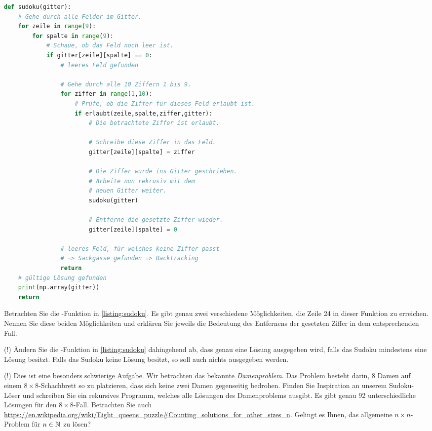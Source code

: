 \lstset{style=BaselineStyle}
\begin{lstlisting}[language=Python,caption=Implementation der Funktion \pythoninline{sudoku},label=listing:sudoku]
def sudoku(gitter):
	# Gehe durch alle Felder im Gitter.
	for zeile in range(9):
		for spalte in range(9):
			# Schaue, ob das Feld noch leer ist.
			if gitter[zeile][spalte] == 0:
				# leeres Feld gefunden

				# Gehe durch alle 10 Ziffern 1 bis 9.
				for ziffer in range(1,10):
					# Prüfe, ob die Ziffer für dieses Feld erlaubt ist.
					if erlaubt(zeile,spalte,ziffer,gitter):
						# Die betrachtete Ziffer ist erlaubt.

						# Schreibe diese Ziffer in das Feld.
						gitter[zeile][spalte] = ziffer

						# Die Ziffer wurde ins Gitter geschrieben.
						# Arbeite nun rekrusiv mit dem
						# neuen Gitter weiter.
						sudoku(gitter)

						# Entferne die gesetzte Ziffer wieder.
						gitter[zeile][spalte] = 0

				# leeres Feld, für welches keine Ziffer passt
				# => Sackgasse gefunden => Backtracking
				return
	# gültige Lösung gefunden
	print(np.array(gitter))
	return
\end{lstlisting}

\begin{myexercise}\label{myexercise:0681}
	Betrachten Sie die -Funktion in \cref{listing:sudoku}. Es gibt genau zwei verschiedene Möglichkeiten, die Zeile 24 in dieser Funktion zu erreichen. Nennen Sie diese beiden Möglichkeiten und erklären Sie jeweils die Bedeutung des Entfernens der gesetzten Ziffer in dem entsprechenden Fall.
\end{myexercise}

\begin{myexercise}\label{myexercise:0603}
	(!) Ändern Sie die -Funktion in \cref{listing:sudoku} dahingehend ab, dass genau eine Lösung ausgegeben wird, falls das Sudoku mindestens eine Lösung besitzt. Falls das Sudoku keine Lösung besitzt, so soll auch nichts ausgegeben werden.
\end{myexercise}

\begin{myexercise}\label{myexercise:0604}
	(!) Dies ist eine besonders schwierige Aufgabe. Wir betrachten das bekannte \textit{Damenproblem}. Das Problem besteht darin, 8 Damen auf einem $8\times 8$-Schachbrett so zu platzieren, dass sich keine zwei Damen gegenseitig bedrohen. Finden Sie Inspiration an unserem Sudoku-Löser und schreiben Sie ein rekursives Programm, welches alle Lösungen des Damenproblems ausgibt. Es gibt genau 92 unterschiedliche Lösungen für den $8\times 8$-Fall. Betrachten Sie auch \url{https://en.wikipedia.org/wiki/Eight\_queens\_puzzle#Counting\_solutions\_for\_other\_sizes\_n}. Gelingt es Ihnen, das allgemeine $n\times n$-Problem für $n\in\mathbb{N}$ zu lösen?
\end{myexercise}


